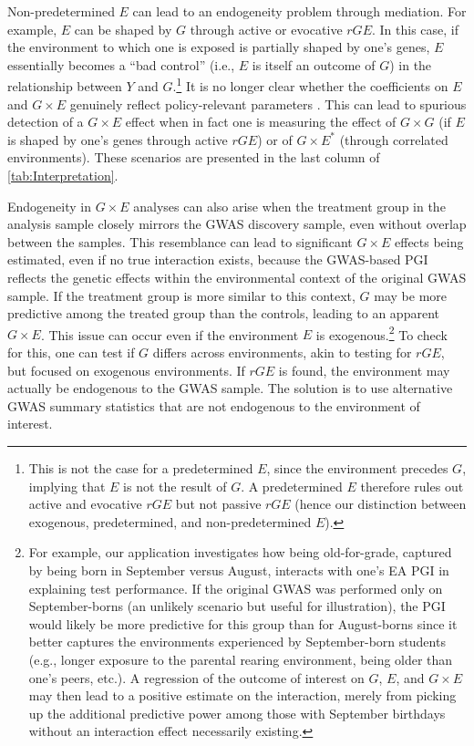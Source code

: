 \documentclass[12pt,a4paper]{article}
\begin{document}
\begin{bibunit}
Non-predetermined $E$ can lead to an endogeneity problem through mediation. For example, $E$ can be shaped by $G$ through active or evocative $rGE$. In this case, if the environment to which one is exposed is partially shaped by one's genes, $E$ essentially becomes a ``bad control'' (i.e., $E$ is itself an outcome of $G$) in the relationship between $Y$ and $G$.\footnote{This is not the case for a predetermined $E$, since the environment precedes $G$, implying that $E$ is not the result of $G$. A predetermined $E$ therefore rules out active and evocative $rGE$ but not passive $rGE$ (hence our distinction between exogenous, predetermined, and non-predetermined $E$).}  
It is no longer clear whether the coefficients on $E$ and $G \times E$ genuinely reflect policy-relevant parameters \citep{Wagner2013rge}. This can lead to spurious detection of a $G \times E$ effect when in fact one is measuring the effect of $G \times G$ (if $E$ is shaped by one's genes through active $rGE$) or of $G \times E^*$ (through correlated environments). These scenarios are presented in the last column of \autoref{tab:Interpretation}.  

Endogeneity in $G \times E$ analyses can also arise when the treatment group in the analysis sample closely mirrors the GWAS discovery sample, even without overlap between the samples. This resemblance can lead to significant $G \times E$ effects being estimated, even if no true interaction exists, because the GWAS-based PGI reflects the genetic effects within the environmental context of the original GWAS sample. If the treatment group is more similar to this context, $G$ may be more predictive among the treated group than the controls, leading to an apparent $G \times E$. 
This issue can occur even if the environment $E$ is exogenous.\footnote{For example, our application investigates how being old-for-grade, captured by being born in September versus August, interacts with one's EA PGI in explaining test performance. If the original GWAS was performed only on September-borns (an unlikely scenario but useful for illustration), the PGI would likely be more predictive for this group than for August-borns since it better captures the environments experienced by September-born students (e.g., longer exposure to the parental rearing environment, being older than one's peers, etc.). A regression of the outcome of interest on $G$, $E$, and $G \times E$ may then lead to a positive estimate on the interaction, merely from picking up the additional predictive power among those with September birthdays without an interaction effect necessarily existing.} To check for this, one can test if $G$ differs across environments, akin to testing for $rGE$, but focused on exogenous environments. If $rGE$ is found, the environment may actually be endogenous to the GWAS sample. The solution is to use alternative GWAS summary statistics that are not endogenous to the environment of interest.


\end{bibunit}
\end{document}
